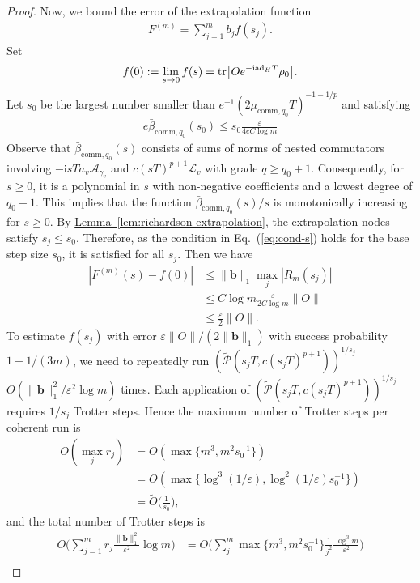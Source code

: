 \documentclass[11pt]{article}
\newcommand{\eq}[1]{(\ref{eq:#1})}
\newcommand{\lem}[1]{\hyperref[lem:#1]{Lemma~\ref*{lem:#1}}}
\renewcommand{\i}{\mathrm{i}}
\newcommand{\ad}{\mathrm{ad}}
\newcommand{\eps}{\varepsilon}
\newcommand{\mc}{\mathcal}
\begin{document}
\begin{proof}
    Now, we bound the error of the extrapolation function \begin{align*}
        F^{(m)} = \sum_{j=1}^m b_j f(s_j).
    \end{align*}
    Set \begin{align*}
        f(0) :=\lim_{s\to 0} f(s) = \tr[Oe^{-\i \ad_H T}\rho_0].
    \end{align*} Let $s_0$ be the largest number smaller than $e^{-1}(2\mu_{\mathrm{comm},q_0}T)^{-1-1/p}$ and satisfying \begin{align*}
        e\bar\beta_{\mathrm{comm},q_0}(s_0)\le s_0\frac{\eps}{4eC \log m}
    \end{align*}
    Observe that $\bar\beta_{\mathrm{comm}, q_0}(s)$ consists of sums of norms of nested commutators involving $-\i sT a_v \mc{A}_{\gamma_v}$ and $c(sT)^{p+1} \mc L_{v}$ with grade $q \ge q_0+1$. Consequently, for $s \ge 0$, it is a polynomial in $s$ with non-negative coefficients and a lowest degree of $q_0+1$. This implies that the function $\bar\beta_{\mathrm{comm}, q_0}(s)/s$ is monotonically increasing for $s \ge 0$. 
    By \lem{richardson-extrapolation}, the extrapolation nodes satisfy $s_j \le s_0$. Therefore, as the condition in Eq.~\eq{cond-s} holds for the base step size $s_0$, it is satisfied for all $s_j$.
    Then we have \begin{align*}
        |F^{(m)}(s)-f(0)|&\le \|\mathbf{b}\|_1 \max_j|R_m(s_j)| \\
        &\le C\log m\frac{\eps}{2C\log m}\|O\|\\
        &\le \frac{\eps }{2}\|O\|.
    \end{align*}
    To estimate $f(s_j)$ with error $\eps\|O\|/(2\|\mathbf{b}\|_1)$ with success probability $1-1/(3m)$, we need to repeatedly run $(\tilde{\mc P}(s_jT, c(s_jT)^{p+1}))^{1/s_j}$ $O(\|\mathbf{b}\|_1^2/\eps^2\log m)$ times.  Each application of $(\tilde{\mc P}(s_jT, c(s_jT)^{p+1}))^{1/s_j}$ requires $1/s_j$ Trotter steps. Hence the maximum number of Trotter steps per coherent run is \begin{align*}
        O(\max_j r_j) & = O( \max\{m^3, m^2s_0^{-1}\})\\
        &=O( \max\{\log^3(1/\eps), \log^2(1/\eps)s_0^{-1}\}) \\
        &= \widetilde{O}\Big(\frac{1}{s_0}\Big),
    \end{align*} and the total number of Trotter steps is \begin{align*}
        O\Big(\sum_{j=1}^m r_j\frac{\|\mathbf{b}\|_1^2}{\eps^2}\log m\Big) & = O\Big(\sum_j^{m} \max\{m^3, m^2s_0^{-1}\}\frac{1}{j^2}\frac{\log^3 m}{\eps^2}\Big)\\

\end{align*}
\end{proof}
\end{document}
